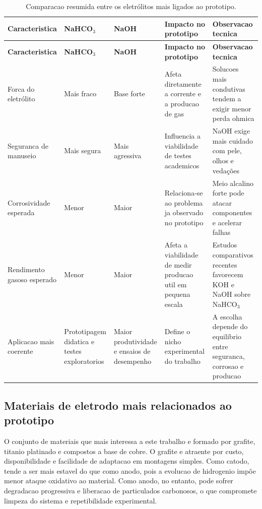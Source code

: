 \documentclass[12pt,oneside,a4paper,english,brazilian]{abntex2}
\begin{document}
\small
\setlength{\tabcolsep}{3pt}
\begin{longtable}{@{}>{\RaggedRight\arraybackslash}p{}>{\RaggedRight\arraybackslash}p{}>{\RaggedRight\arraybackslash}p{}>{\RaggedRight\arraybackslash}p{}>{\RaggedRight\arraybackslash}p{}@{}}
\caption{Comparacao resumida entre os eletrólitos mais ligados ao prototipo.}\label{tab:eletrolitos-prototipo}\\
\toprule
\textbf{Caracteristica} & \textbf{NaHCO$_3$} & \textbf{NaOH} & \textbf{Impacto no prototipo} & \textbf{Observacao tecnica} \\
\midrule
\endfirsthead

\toprule
\textbf{Caracteristica} & \textbf{NaHCO$_3$} & \textbf{NaOH} & \textbf{Impacto no prototipo} & \textbf{Observacao tecnica} \\
\midrule
\endhead

\midrule
\endfoot

\bottomrule
\endlastfoot

Forca do eletrólito & Mais fraco & Base forte & Afeta diretamente a corrente e a producao de gas & Solucoes mais condutivas tendem a exigir menor perda ohmica \\
\midrule
Seguranca de manuseio & Mais segura & Mais agressiva & Influencia a viabilidade de testes academicos & NaOH exige mais cuidado com pele, olhos e vedações \\
\midrule
Corrosividade esperada & Menor & Maior & Relaciona-se ao problema ja observado no prototipo & Meio alcalino forte pode atacar componentes e acelerar falhas \\
\midrule
Rendimento gasoso esperado & Menor & Maior & Afeta a viabilidade de medir producao util em pequena escala & Estudos comparativos recentes favorecem KOH e NaOH sobre NaHCO$_3$ \\
\midrule
Aplicacao mais coerente & Prototipagem didatica e testes exploratorios & Maior produtividade e ensaios de desempenho & Define o nicho experimental do trabalho & A escolha depende do equilibrio entre seguranca, corrosao e producao \\
\end{longtable}
\normalsize

\subsection{Materiais de eletrodo mais relacionados ao prototipo}

O conjunto de materiais que mais interessa a este trabalho e formado por grafite, titanio platinado e compostos a base de cobre. O grafite e atraente por custo, disponibilidade e facilidade de adaptacao em montagens simples. Como catodo, tende a ser mais estavel do que como anodo, pois a evolucao de hidrogenio impõe menor ataque oxidativo ao material. Como anodo, no entanto, pode sofrer degradacao progressiva e liberacao de particulados carbonosos, o que compromete limpeza do sistema e repetibilidade experimental.
\end{document}
